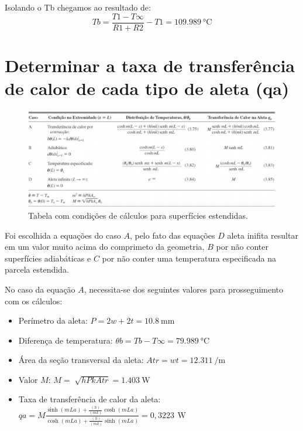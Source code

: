 Isolando o Tb chegamos ao resultado de:
\begin{equation}
    {Tb}={\frac{T1 -T\infty}{{R1}+{R2}}}-{T1} = \SI{109,989}{\degreeCelsius}
\end{equation}

\section{Determinar a taxa de transferência de calor de cada tipo de aleta (qa)}\label{sec:calcTable}

\begin{figure}[h]
    \centering
    \caption{Tabela com condições de cálculos para superfícies estendidas.}
    \label{fig:tabelaCasosCalc}
    \includegraphics[width=15cm]{figuras/tabelaCasosCalc.jpg}
\end{figure}

Foi escolhida a equações do caso \(A\), pelo fato das equações
\(D\) aleta inifita resultar em um valor muito acima do comprimeto da
geometria,
\(B\) por não conter superfícies adiabáticas
e \(C\) por não conter uma temperatura especificada na parcela estendida.
\par No caso da equação \(A\), necessita-se dos seguintes valores
para prosseguimento com os cálculos:
\begin{itemize}[leftmargin=2cm]
    \item Perímetro da aleta: \(
          {P}={2w+2t} = \SI{10,8}{\milli\meter}
          \)
    \item Diferença de temperatura: \(
          {\theta}b={{Tb}-{T\infty}} = \SI{79,989}{\degreeCelsius}
          \)
    \item Área da seção transversal da aleta: \(
          {Atr}={{w}{t}} = \SI{12,311}{\per\meter}
          \)
    \item Valor \(M\): \(
          {M}={\sqrt[]{{h}{P}{k}{Atr}}} = \SI{1,403}{\watt}
          \)
    \item Taxa de transferência
          de calor da aleta: \\\(
          {qa}={M}{
          \frac
          {\sinh{(mLa)}+{\frac{(h)}{(mk)}}{\cosh{(mLa)}}}
          {\cosh{(mLa)}+{\frac{(h)}{(mk)}}{\sinh{(mLa)}}}
          }={0,3223\,\SI{}{\watt}}
          \)
\end{itemize}
